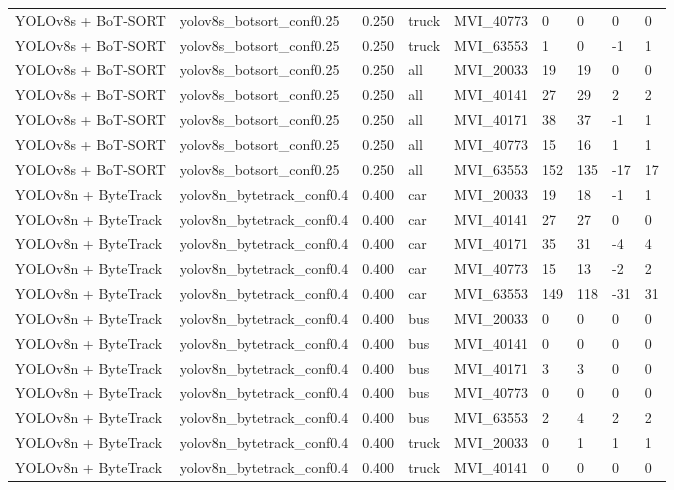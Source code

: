 \begin{tabular}{lllllllll}
YOLOv8s + BoT-SORT & yolov8s\_botsort\_conf0.25 & 0.250 & truck & MVI\_40773 & 0 & 0 & 0 & 0 \\
YOLOv8s + BoT-SORT & yolov8s\_botsort\_conf0.25 & 0.250 & truck & MVI\_63553 & 1 & 0 & -1 & 1 \\
YOLOv8s + BoT-SORT & yolov8s\_botsort\_conf0.25 & 0.250 & all & MVI\_20033 & 19 & 19 & 0 & 0 \\
YOLOv8s + BoT-SORT & yolov8s\_botsort\_conf0.25 & 0.250 & all & MVI\_40141 & 27 & 29 & 2 & 2 \\
YOLOv8s + BoT-SORT & yolov8s\_botsort\_conf0.25 & 0.250 & all & MVI\_40171 & 38 & 37 & -1 & 1 \\
YOLOv8s + BoT-SORT & yolov8s\_botsort\_conf0.25 & 0.250 & all & MVI\_40773 & 15 & 16 & 1 & 1 \\
YOLOv8s + BoT-SORT & yolov8s\_botsort\_conf0.25 & 0.250 & all & MVI\_63553 & 152 & 135 & -17 & 17 \\
YOLOv8n + ByteTrack & yolov8n\_bytetrack\_conf0.4 & 0.400 & car & MVI\_20033 & 19 & 18 & -1 & 1 \\
YOLOv8n + ByteTrack & yolov8n\_bytetrack\_conf0.4 & 0.400 & car & MVI\_40141 & 27 & 27 & 0 & 0 \\
YOLOv8n + ByteTrack & yolov8n\_bytetrack\_conf0.4 & 0.400 & car & MVI\_40171 & 35 & 31 & -4 & 4 \\
YOLOv8n + ByteTrack & yolov8n\_bytetrack\_conf0.4 & 0.400 & car & MVI\_40773 & 15 & 13 & -2 & 2 \\
YOLOv8n + ByteTrack & yolov8n\_bytetrack\_conf0.4 & 0.400 & car & MVI\_63553 & 149 & 118 & -31 & 31 \\
YOLOv8n + ByteTrack & yolov8n\_bytetrack\_conf0.4 & 0.400 & bus & MVI\_20033 & 0 & 0 & 0 & 0 \\
YOLOv8n + ByteTrack & yolov8n\_bytetrack\_conf0.4 & 0.400 & bus & MVI\_40141 & 0 & 0 & 0 & 0 \\
YOLOv8n + ByteTrack & yolov8n\_bytetrack\_conf0.4 & 0.400 & bus & MVI\_40171 & 3 & 3 & 0 & 0 \\
YOLOv8n + ByteTrack & yolov8n\_bytetrack\_conf0.4 & 0.400 & bus & MVI\_40773 & 0 & 0 & 0 & 0 \\
YOLOv8n + ByteTrack & yolov8n\_bytetrack\_conf0.4 & 0.400 & bus & MVI\_63553 & 2 & 4 & 2 & 2 \\
YOLOv8n + ByteTrack & yolov8n\_bytetrack\_conf0.4 & 0.400 & truck & MVI\_20033 & 0 & 1 & 1 & 1 \\
YOLOv8n + ByteTrack & yolov8n\_bytetrack\_conf0.4 & 0.400 & truck & MVI\_40141 & 0 & 0 & 0 & 0 \\

\end{tabular}
